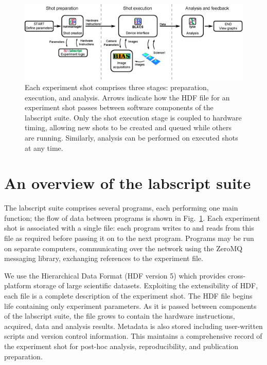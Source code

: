 \begin{figure}%
\includegraphics{figures/software/flow_chart_simple.eps}%
\caption{Each experiment shot comprises three stages: preparation, execution, and analysis.
Arrows indicate how the HDF file for an experiment shot passes between software components of the labscript suite.
Only the shot execution stage is coupled to hardware timing, allowing new shots to be created and queued while others are running.
Similarly, analysis can be performed on executed shots at any time.
}



\label{flow_chart}%
\end{figure}

\section{An overview of the labscript suite}
The labscript suite comprises several programs, each performing one main function; the flow of data between programs is shown in Fig.~\ref{flow_chart}.
Each experiment shot is associated with a single file: each program writes to and reads from this file as required before passing it on to the next program.
Programs may be run on separate computers, communicating over the network using the ZeroMQ messaging library\cite{hintjens_code_2013}, exchanging references to the experiment file.

We use the Hierarchical Data Format (HDF version 5)\cite{the_hdf_group_hdf5_2012} which provides cross-platform storage of large scientific datasets.
Exploiting the extensibility of HDF, each file is a complete description of the experiment shot.
The HDF file begins life containing only experiment parameters.
As it is passed between components of the labscript suite, the file grows to contain the hardware instructions, acquired, data and analysis results.
Metadata is also stored including user-written scripts and version control information.
This maintains a comprehensive record of the experiment shot for post-hoc analysis, reproducibility, and publication preparation.

